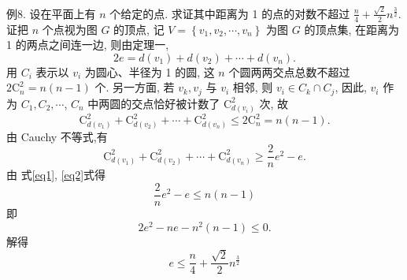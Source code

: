 例8. 设在平面上有 $n$ 个给定的点.
求证其中距离为 1 的点的对数不超过 $\frac{n}{4}+\frac{\sqrt{2}}{2} n^{\frac{3}{2}}$.
证把 $n$ 个点视为图 $G$ 的顶点, 记 $V=\left\{v_1, v_2, \cdots, v_n\right\}$ 为图 $G$ 的顶点集, 在距离为 1 的两点之间连一边, 则由定理一,
$$
2 e=d\left(v_1\right)+d\left(v_2\right)+\cdots+d\left(v_n\right) .
$$
用 $C_i$ 表示以 $v_i$ 为圆心、半径为 1 的圆, 这 $n$ 个圆两两交点总数不超过 $2 \mathrm{C}_n^2=n(n-1)$ 个.
另一方面, 若 $v_k, v_j$ 与 $v_i$ 相邻, 则 $v_i \in C_k \cap C_j$, 因此, $v_i$ 作为 $C_1, C_2, \cdots$, $C_n$ 中两圆的交点恰好被计数了 $\mathrm{C}_{d\left(v_i\right)}^2$ 次, 故
$$
\mathrm{C}_{d\left(v_1\right)}^2+\mathrm{C}_{d\left(v_2\right)}^2+\cdots+\mathrm{C}_{d\left(v_n\right)}^2 \leqslant 2 \mathrm{C}_n^2=n(n-1) . \label{eq1}
$$
由 Cauchy 不等式,有
$$
\mathrm{C}_{d\left(v_1\right)}^2+\mathrm{C}_{d\left(v_2\right)}^2+\cdots+\mathrm{C}_{d\left(v_n\right)}^2 \geqslant \frac{2}{n} e^2-e . \label{eq2}
$$
由 式\ref{eq1}, \ref{eq2}式得
$$
\frac{2}{n} e^2-e \leqslant n(n-1)
$$
即
$$
2 e^2-n e-n^2(n-1) \leqslant 0 .
$$
解得
$$
e \leqslant \frac{n}{4}+\frac{\sqrt{2}}{2} n^{\frac{3}{2}}
$$



